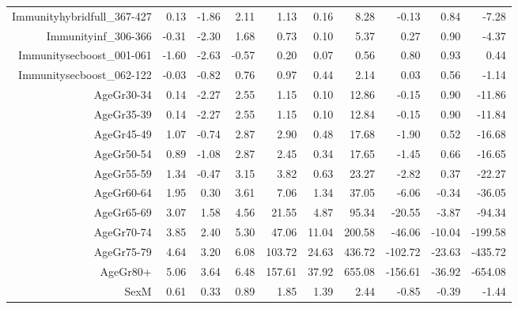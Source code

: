 \begin{table}[ht]
\begin{tabular}{rrrrrrrrrr}
  Immunityhybridfull\_367-427 & 0.13 & -1.86 & 2.11 & 1.13 & 0.16 & 8.28 & -0.13 & 0.84 & -7.28 \\ 
  Immunityinf\_306-366 & -0.31 & -2.30 & 1.68 & 0.73 & 0.10 & 5.37 & 0.27 & 0.90 & -4.37 \\ 
  Immunitysecboost\_001-061 & -1.60 & -2.63 & -0.57 & 0.20 & 0.07 & 0.56 & 0.80 & 0.93 & 0.44 \\ 
  Immunitysecboost\_062-122 & -0.03 & -0.82 & 0.76 & 0.97 & 0.44 & 2.14 & 0.03 & 0.56 & -1.14 \\ 
  AgeGr30-34 & 0.14 & -2.27 & 2.55 & 1.15 & 0.10 & 12.86 & -0.15 & 0.90 & -11.86 \\ 
  AgeGr35-39 & 0.14 & -2.27 & 2.55 & 1.15 & 0.10 & 12.84 & -0.15 & 0.90 & -11.84 \\ 
  AgeGr45-49 & 1.07 & -0.74 & 2.87 & 2.90 & 0.48 & 17.68 & -1.90 & 0.52 & -16.68 \\ 
  AgeGr50-54 & 0.89 & -1.08 & 2.87 & 2.45 & 0.34 & 17.65 & -1.45 & 0.66 & -16.65 \\ 
  AgeGr55-59 & 1.34 & -0.47 & 3.15 & 3.82 & 0.63 & 23.27 & -2.82 & 0.37 & -22.27 \\ 
  AgeGr60-64 & 1.95 & 0.30 & 3.61 & 7.06 & 1.34 & 37.05 & -6.06 & -0.34 & -36.05 \\ 
  AgeGr65-69 & 3.07 & 1.58 & 4.56 & 21.55 & 4.87 & 95.34 & -20.55 & -3.87 & -94.34 \\ 
  AgeGr70-74 & 3.85 & 2.40 & 5.30 & 47.06 & 11.04 & 200.58 & -46.06 & -10.04 & -199.58 \\ 
  AgeGr75-79 & 4.64 & 3.20 & 6.08 & 103.72 & 24.63 & 436.72 & -102.72 & -23.63 & -435.72 \\ 
  AgeGr80+ & 5.06 & 3.64 & 6.48 & 157.61 & 37.92 & 655.08 & -156.61 & -36.92 & -654.08 \\ 
  SexM & 0.61 & 0.33 & 0.89 & 1.85 & 1.39 & 2.44 & -0.85 & -0.39 & -1.44 \\ 
   \hline
\end{tabular}
\end{table}
